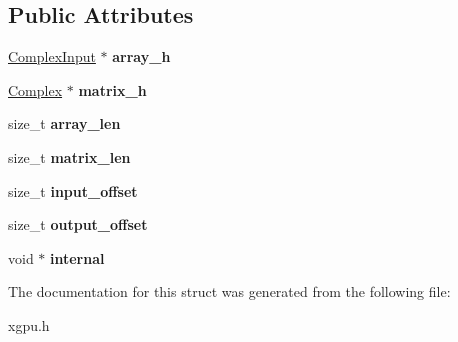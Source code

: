 \subsection*{Public Attributes}
\begin{DoxyCompactItemize}
\item 
\hyperlink{struct_complex_input_struct}{Complex\+Input} $\ast$ {\bfseries array\+\_\+h}\hypertarget{struct_x_g_p_u_context_struct_aba27d0dbd627f5659af939e92d2ecbd9}{}\label{struct_x_g_p_u_context_struct_aba27d0dbd627f5659af939e92d2ecbd9}

\item 
\hyperlink{struct_complex_struct}{Complex} $\ast$ {\bfseries matrix\+\_\+h}\hypertarget{struct_x_g_p_u_context_struct_a6f2c18a28d09fd00ee5f1f13f509d65f}{}\label{struct_x_g_p_u_context_struct_a6f2c18a28d09fd00ee5f1f13f509d65f}

\item 
size\+\_\+t {\bfseries array\+\_\+len}\hypertarget{struct_x_g_p_u_context_struct_a1eb6879fcb0dd40a373270bcc35fcc41}{}\label{struct_x_g_p_u_context_struct_a1eb6879fcb0dd40a373270bcc35fcc41}

\item 
size\+\_\+t {\bfseries matrix\+\_\+len}\hypertarget{struct_x_g_p_u_context_struct_a607940c2f3ea8730d9792651e397dbe9}{}\label{struct_x_g_p_u_context_struct_a607940c2f3ea8730d9792651e397dbe9}

\item 
size\+\_\+t {\bfseries input\+\_\+offset}\hypertarget{struct_x_g_p_u_context_struct_a5b358bfee75ebe99a5239f01ed500b3a}{}\label{struct_x_g_p_u_context_struct_a5b358bfee75ebe99a5239f01ed500b3a}

\item 
size\+\_\+t {\bfseries output\+\_\+offset}\hypertarget{struct_x_g_p_u_context_struct_aa9f10831a140090d5bbc1cbc13c2be99}{}\label{struct_x_g_p_u_context_struct_aa9f10831a140090d5bbc1cbc13c2be99}

\item 
void $\ast$ {\bfseries internal}\hypertarget{struct_x_g_p_u_context_struct_ab0b0f8fb59163f309e3cc53970e8e183}{}\label{struct_x_g_p_u_context_struct_ab0b0f8fb59163f309e3cc53970e8e183}

\end{DoxyCompactItemize}


The documentation for this struct was generated from the following file\+:\begin{DoxyCompactItemize}
\item 
xgpu.\+h\end{DoxyCompactItemize}
